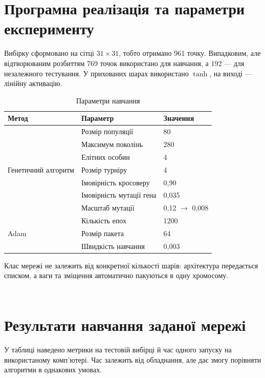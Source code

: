 \documentclass[12pt,a4paper]{article}
\newcommand{\srcDir}{../src}
\begin{document}
\section{Програмна реалізація та параметри експерименту}
Вибірку сформовано на сітці $31\times31$, тобто отримано 961 точку. Випадковим, але відтворюваним розбиттям 769 точок використано для навчання, а 192 --- для незалежного тестування. У прихованих шарах використано $\tanh$, на виході --- лінійну активацію.

\begin{table}[H]
\centering
\begin{tabular}{lll}
\toprule
Метод & Параметр & Значення\\
\midrule
\multirow{7}{*}{Генетичний алгоритм}
& Розмір популяції & 80\\
& Максимум поколінь & 280\\
& Елітних особин & 4\\
& Розмір турніру & 4\\
& Імовірність кросоверу & 0,90\\
& Імовірність мутації гена & 0,035\\
& Масштаб мутації & 0,12 $\rightarrow$ 0,008\\
\midrule
\multirow{3}{*}{Adam}
& Кількість епох & 1200\\
& Розмір пакета & 64\\
& Швидкість навчання & 0,003\\
\bottomrule
\end{tabular}
\caption{Параметри навчання}
\end{table}

Клас мережі не залежить від конкретної кількості шарів: архітектура передається списком, а ваги та зміщення автоматично пакуються в одну хромосому.

\begin{listing}[H]
\inputminted[firstline=48,lastline=73]{python}{\srcDir/mkr_core.py}
\caption{Опис архітектури та розпакування хромосоми}
\end{listing}

\begin{listing}[H]
\inputminted[firstline=75,lastline=92]{python}{\srcDir/mkr_core.py}
\caption{Пакування параметрів і пряме поширення сигналу}
\end{listing}

\section{Результати навчання заданої мережі}
У таблиці наведено метрики на тестовій вибірці й час одного запуску на використаному комп'ютері. Час залежить від обладнання, але дає змогу порівняти алгоритми в однакових умовах.
\end{document}
